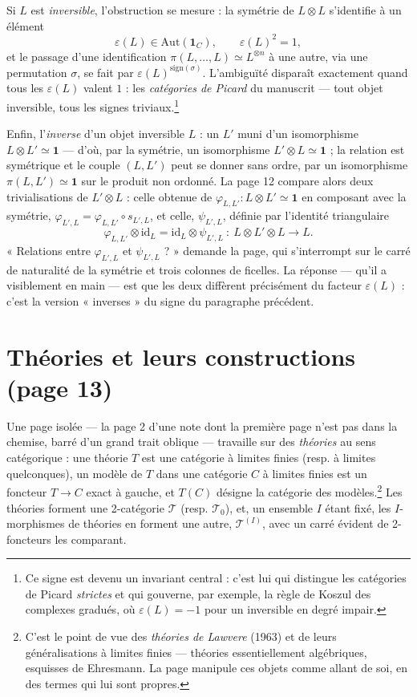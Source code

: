 \documentclass[11pt,a4paper]{article}
\begin{document}
Si $L$ est \emph{inversible}, l'obstruction se mesure : la symétrie de
$L \otimes L$ s'identifie à un élément
\[
\varepsilon(L) \in \mathrm{Aut}(\mathbf{1}_C), \qquad \varepsilon(L)^2 = 1,
\]
et le passage d'une identification $\pi(L,\dots,L) \simeq L^{\otimes n}$ à
une autre, via une permutation $\sigma$, se fait par
$\varepsilon(L)^{\mathrm{sign}(\sigma)}$. L'ambiguïté disparaît exactement
quand tous les $\varepsilon(L)$ valent $1$ : les \emph{catégories de
Picard} du manuscrit — tout objet inversible, tous les signes
triviaux.\footnote{Ce signe est devenu un invariant central : c'est lui qui
distingue les catégories de Picard \emph{strictes} et qui gouverne, par
exemple, la règle de Koszul des complexes gradués, où
$\varepsilon(L) = -1$ pour un inversible en degré impair.}

Enfin, l'\emph{inverse} d'un objet inversible $L$ : un $L'$ muni d'un
isomorphisme $L \otimes L' \simeq \mathbf{1}$ — d'où, par la symétrie, un
isomorphisme $L' \otimes L \simeq \mathbf{1}$ ; la relation est symétrique
et le couple $(L, L')$ peut se donner sans ordre, par un isomorphisme
$\pi(L, L') \simeq \mathbf{1}$ sur le produit non ordonné. La page 12
compare alors deux trivialisations de $L' \otimes L$ : celle obtenue de
$\varphi_{L,L'} : L \otimes L' \simeq \mathbf{1}$ en composant avec la
symétrie, $\varphi_{L',L} = \varphi_{L,L'} \circ s_{L',L}$, et celle,
$\psi_{L',L}$, définie par l'identité triangulaire
\[
\varphi_{L,L'} \otimes \mathrm{id}_L = \mathrm{id}_L \otimes \psi_{L',L}
\ :\ L \otimes L' \otimes L \longrightarrow L.
\]
« Relations entre $\varphi_{L',L}$ et $\psi_{L',L}$ ? » demande la page, qui s'interrompt sur le carré de naturalité de la symétrie et
trois colonnes de ficelles. La réponse — qu'il a visiblement en main —
est que les deux diffèrent précisément du facteur $\varepsilon(L)$ :
c'est la version « inverses » du signe du paragraphe précédent.

\section*{Théories et leurs constructions (page 13)}

Une page isolée — la page 2 d'une note dont la première page n'est pas
dans la chemise, barré d'un grand trait oblique — travaille sur des
\emph{théories} au sens catégorique : une théorie $T$ est une catégorie à
limites finies (resp. à limites quelconques), un modèle de $T$ dans une
catégorie $C$ à limites finies est un foncteur $T \to C$ exact à gauche, et
$T(C)$ désigne la catégorie des modèles.\footnote{C'est le point de vue des
\emph{théories de Lawvere} (1963) et de leurs généralisations à limites
finies — théories essentiellement algébriques, esquisses de Ehresmann. La page manipule ces objets comme allant de soi, en des termes qui lui
sont propres.} Les théories forment une 2-catégorie $\mathcal{T}$ (resp.
$\mathcal{T}_0$), et, un ensemble $I$ étant fixé, les $I$-morphismes de
théories en forment une autre, $\mathcal{T}^{(I)}$, avec un carré évident
de 2-foncteurs les comparant.
\end{document}
